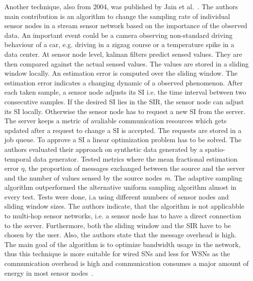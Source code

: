 \par

Another technique, also from 2004, was published by Jain et
al.~\cite{jain2004adaptive}. The authors main contribution is an algorithm to
change the sampling rate of individual sensor nodes in a stream sensor network
based on the importance of the observed data. An important event could be a
camera observing non-standard driving behaviour of a car, e.g. driving in a
zigzag course or a temperature spike in a data center. At sensor node level,
kalman filters predict sensed values. They are then compared against the actual
sensed values. The values are stored in a sliding window locally. An estimation
error is computed over the sliding window. The estimation error indicates a
changing dynamic of a observed phenomenon. After each taken sample, a sensor
node adjusts its \ac{SI} i.e. the time interval between two consecutive
samples. If the desired \ac{SI} lies in the \ac{SIR}, the sensor node can
adjust its \ac{SI} locally. Otherwise the sensor node has to request a new
\ac{SI} from the server. The server keeps a metric of avaliable communication
resources which gets updated after a request to change a \ac{SI} is accepted.
The requests are stored in a job queue. To approve a \ac{SI} a linear
optimization problem has to be solved. The authors evaluated their approach on
synthetic data generated by a spatio-temporal data generator. Tested metrics
where the mean fractional estimation error $ \eta $, the proportion of messages
exchanged between the source and the server and the number of values sensed by
the source nodes \textit{m}. The adaptive sampling algorithm outperformed the
alternative uniform sampling algorithm almost in every test. Tests were done,
i.a using different numbers of sensor nodes and sliding window sizes. The
authors indicate, that the algorithm is not applicabble to multi-hop sensor
networks, i.e. a sensor node has to have a direct connection to the server.
Furthermore, both the sliding window and the \ac{SIR} have to be chosen by the
user. Also, the authors state that the message overhead is high. The main goal
of the algorithm is to optimize bandwidth usage in the network, thus this
technique is more suitable for wired \acp{SN} and less for \acp{WSN} as the
communication overhead is high and communication consumes a major amount of
energy in most sensor nodes~\cite{raghunathan2002energy}.

\par


